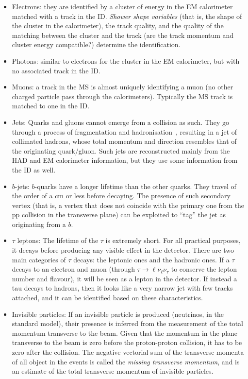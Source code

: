 \begin{itemize}
\item{Electrons:} they are identified by a cluster of energy in the EM calorimeter matched with a track in the ID. \textit{Shower shape variables} (that is, the shape of the cluster in the calorimeter), the track quality, and the quality of the matching between the cluster and the track (are the track momentum and cluster energy compatible?) determine the identification. 
\item{Photons:} similar to electrons for the cluster in the EM calorimeter, but with no associated track in the ID. 
\item{Muons:} a track in the MS is almost uniquely identifying a muon (no other charged particle pass through the calorimeters). Typically the MS track is matched to one in the ID. 
\item{Jets:} Quarks and gluons cannot emerge from a collision as such. They go through a process of fragmentation and hadronisation~\cite{fragment_hadronise}, resulting in a jet of collimated hadrons, whose total momentum and direction resembles that of the originating quark/gluon. Such jets are reconstructed mainly from the HAD and EM calorimeter information, but they use some information from the ID as well. 
\item{$b$-jets:} $b$-quarks have a longer lifetime than the other quarks. They travel of the order of a cm or less before decaying. The presence of such secondary vertex (that is, a vertex that does not coincide with the primary one from the pp collision in the transverse plane) can be exploited to ``tag'' the jet as originating from a $b$.
\item{$\tau$ leptons:} The lifetime of the $\tau$ is extremely short. For all practical purposes, it decays before producing any visible effect in the detector. There are two main categories of $\tau$ decays: the leptonic ones and the hadronic ones. If a $\tau$ decays to an electron and muon (through $\tau\rightarrow \ell \bar{\nu}_{\ell} \nu_{\tau}$ to conserve the lepton number and flavour), it will be seen as a lepton in the detector. If instead a tau decays to hadrons, then it looks like a very narrow jet with few tracks attached, and it can be identified based on these characteristics. 
\item{Invisible particles:} If an invisible particle is produced (neutrinos, in the standard model), their presence is inferred from the measurement of the total momentum transverse to the beam. Given that the momentum in the plane transverse to the beam is zero before the proton-proton collision, it has to be zero after the collision. The negative vectorial sum of the transverse momenta of all object in the events is called the \textit{missing transverse momentum}, and is an estimate of the total transverse momentum of invisible particles.   
\end{itemize}

